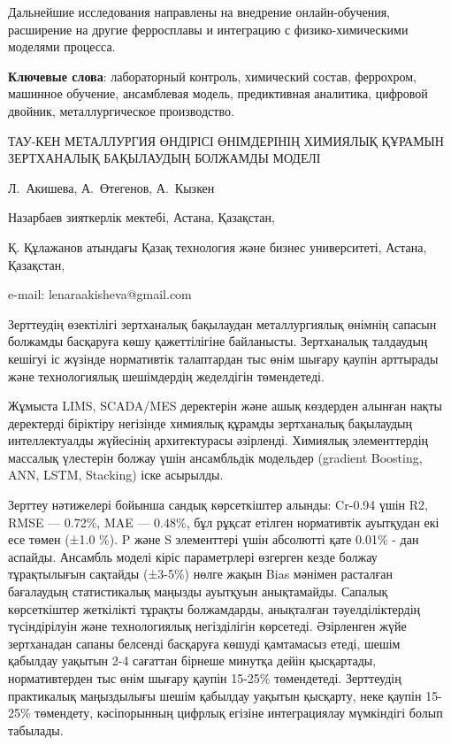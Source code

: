 Дальнейшие исследования направлены на внедрение онлайн-обучения,
расширение на другие ферросплавы и интеграцию с физико-химическими
моделями процесса.

{\bfseries Ключевые слова}: лабораторный контроль, химический состав,
феррохром, машинное обучение, ансамблевая модель, предиктивная
аналитика, цифровой двойник, металлургическое производство.
\vspace{-0.3em}
\begin{header}
ТАУ-КЕН МЕТАЛЛУРГИЯ ӨНДІРІСІ ӨНІМДЕРІНІҢ ХИМИЯЛЫҚ ҚҰРАМЫН ЗЕРТХАНАЛЫҚ БАҚЫЛАУДЫҢ БОЛЖАМДЫ МОДЕЛІ

Л.~Акишева\envelope,
А.~Өтегенов,
А.~Кызкен
\end{header}
\vspace{0.2em}
\begin{affil}
Назарбаев зияткерлік мектебі, Астана, Қазақстан,

Қ. Құлажанов атындағы Қазақ технология және бизнес университеті, Астана, Қазақстан,

e-mail: lenaraakisheva@gmail.com
\end{affil}

Зерттеудің өзектілігі зертханалық бақылаудан металлургиялық өнімнің
сапасын болжамды басқаруға көшу қажеттілігіне байланысты. Зертханалық
талдаудың кешігуі іс жүзінде нормативтік талаптардан тыс өнім шығару
қаупін арттырады және технологиялық шешімдердің жеделдігін төмендетеді.

Жұмыста LIMS, SCADA/MES деректерін және ашық көздерден алынған нақты
деректерді біріктіру негізінде химиялық құрамды зертханалық бақылаудың
интеллектуалды жүйесінің архитектурасы әзірленді. Химиялық элементтердің
массалық үлестерін болжау үшін ансамбльдік модельдер (gradient Boosting,
ANN, LSTM, Stacking) іске асырылды.

Зерттеу нәтижелері бойынша сандық көрсеткіштер алынды: Cr-0.94 үшін R2,
RMSE --- 0.72\%, MAE --- 0.48\%, бұл рұқсат етілген нормативтік
ауытқудан екі есе төмен (±1.0 \%). P және S элементтері үшін абсолютті
қате 0.01\% - дан аспайды. Ансамбль моделі кіріс параметрлері өзгерген
кезде болжау тұрақтылығын сақтайды (±3-5\%) нөлге жақын Bias мәнімен
расталған бағалаудың статистикалық маңызды ауытқуын анықтамайды. Сапалық
көрсеткіштер жеткілікті тұрақты болжамдарды, анықталған тәуелділіктердің
түсіндірілуін және технологиялық негізділігін көрсетеді. Әзірленген жүйе
зертханадан сапаны белсенді басқаруға көшуді қамтамасыз етеді, шешім
қабылдау уақытын 2-4 сағаттан бірнеше минутқа дейін қысқартады,
нормативтерден тыс өнім шығару қаупін 15-25\% төмендетеді. Зерттеудің
практикалық маңыздылығы шешім қабылдау уақытын қысқарту, неке қаупін
15-25\% төмендету, кәсіпорынның цифрлық егізіне интеграциялау мүмкіндігі
болып табылады.

